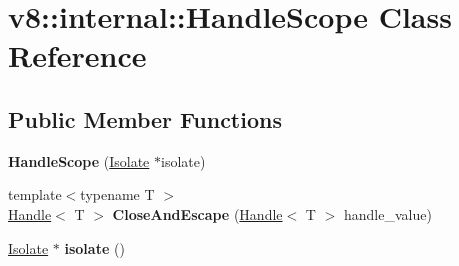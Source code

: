 \hypertarget{classv8_1_1internal_1_1_handle_scope}{}\section{v8\+:\+:internal\+:\+:Handle\+Scope Class Reference}
\label{classv8_1_1internal_1_1_handle_scope}
\subsection*{Public Member Functions}
\begin{DoxyCompactItemize}
\item 
\hypertarget{classv8_1_1internal_1_1_handle_scope_a3742f18d5b401cc58fcf6168ebca077d}{}{\bfseries Handle\+Scope} (\hyperlink{classv8_1_1internal_1_1_isolate}{Isolate} $\ast$isolate)\label{classv8_1_1internal_1_1_handle_scope_a3742f18d5b401cc58fcf6168ebca077d}

\item 
\hypertarget{classv8_1_1internal_1_1_handle_scope_a37fa551b0621f759ebc0aed8d8061384}{}{\footnotesize template$<$typename T $>$ }\\\hyperlink{classv8_1_1internal_1_1_handle}{Handle}$<$ T $>$ {\bfseries Close\+And\+Escape} (\hyperlink{classv8_1_1internal_1_1_handle}{Handle}$<$ T $>$ handle\+\_\+value)\label{classv8_1_1internal_1_1_handle_scope_a37fa551b0621f759ebc0aed8d8061384}

\item 
\hypertarget{classv8_1_1internal_1_1_handle_scope_afebe38c26e4dad47b86d195898bd6400}{}\hyperlink{classv8_1_1internal_1_1_isolate}{Isolate} $\ast$ {\bfseries isolate} ()\label{classv8_1_1internal_1_1_handle_scope_afebe38c26e4dad47b86d195898bd6400}

\end{DoxyCompactItemize}
